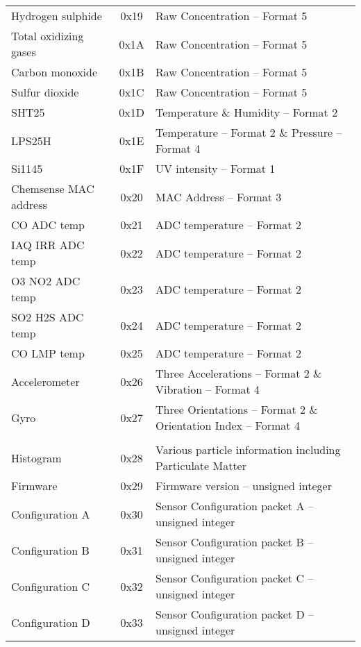 \begin{center}
\begin{longtable}{|l|c|l|}
        Hydrogen sulphide & 0x19 & Raw Concentration -- Format 5\\
        Total oxidizing gases & 0x1A & Raw Concentration -- Format 5\\
        Carbon monoxide & 0x1B & Raw Concentration -- Format 5\\
        Sulfur dioxide & 0x1C & Raw Concentration -- Format 5\\
        SHT25 & 0x1D & Temperature \& Humidity -- Format 2\\
        LPS25H & 0x1E & Temperature -- Format 2 \& Pressure -- Format 4\\
        Si1145 & 0x1F & UV intensity -- Format 1\\
        Chemsense MAC address & 0x20 & MAC Address -- Format 3\\
        CO ADC temp & 0x21 & ADC temperature -- Format 2\\
        IAQ IRR ADC temp & 0x22 & ADC temperature -- Format 2\\
        O3 NO2 ADC temp & 0x23 & ADC temperature -- Format 2\\
        SO2 H2S ADC temp & 0x24 & ADC temperature -- Format 2\\
        CO LMP temp & 0x25 & ADC temperature -- Format 2\\
        Accelerometer & 0x26 & Three Accelerations -- Format 2 \& Vibration -- Format 4\\
        Gyro & 0x27 & Three Orientations -- Format 2 \& Orientation Index -- Format 4\\
     \hline \rowcolor{white} \multicolumn{3}{|c|}{{Alpha sensor}} \\ \hline
        Histogram & 0x28 & Various particle information including Particulate Matter\\
        Firmware & 0x29 & Firmware version  -- unsigned integer\\
        Configuration A & 0x30 & Sensor Configuration packet A -- unsigned integer\\
        Configuration B & 0x31 & Sensor Configuration packet B -- unsigned integer\\
        Configuration C & 0x32 & Sensor Configuration packet C -- unsigned integer\\
        Configuration D & 0x33 & Sensor Configuration packet D -- unsigned integer\\
\end{longtable}
\end{center}



